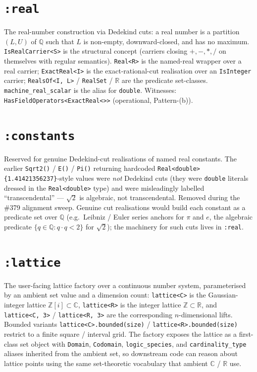 \documentclass[11pt, a4paper]{report}
\begin{document}
\section{\texttt{:real}}
\label{sec:numbers-real}

The real-number construction via Dedekind cuts: a real number is a partition $(L, U)$ of $\mathbb{Q}$ such that $L$ is non-empty, downward-closed, and has no maximum. \texttt{IsRealCarrier<S>} is the structural concept (carriers closing $+, -, *, /$ on themselves with regular semantics). \texttt{Real<R>} is the named-real wrapper over a real carrier; \texttt{ExactReal<I>} is the exact-rational-cut realisation over an \texttt{IsInteger} carrier; \texttt{RealsOf<I, L>} / \texttt{RealSet} / $\mathbb{R}$ are the predicate set-classes. \texttt{machine\_real\_scalar} is the alias for \texttt{double}. Witnesses: \texttt{HasFieldOperators<ExactReal<>>} (operational, Pattern-(b)).

\section{\texttt{:constants}}
\label{sec:numbers-constants}

Reserved for genuine Dedekind-cut realisations of named real constants. The earlier \texttt{Sqrt2()} / \texttt{E()} / \texttt{Pi()} returning hardcoded \texttt{Real<double>\{1.41421356237\}}-style values were \emph{not} Dedekind cuts (they were \texttt{double} literals dressed in the \texttt{Real<double>} type) and were misleadingly labelled ``transcendental'' --- $\sqrt{2}$ is algebraic, not transcendental. Removed during the \#379 alignment sweep. Genuine cut realisations would build each constant as a predicate set over $\mathbb{Q}$ (e.g.\ Leibniz / Euler series anchors for $\pi$ and $e$, the algebraic predicate $\{q \in \mathbb{Q} : q \cdot q < 2\}$ for $\sqrt{2}$); the machinery for such cuts lives in \texttt{:real}.

\section{\texttt{:lattice}}
\label{sec:numbers-lattice}

The user-facing lattice factory over a continuous number system, parameterised by an ambient set value and a dimension count: \texttt{lattice<C>} is the Gaussian-integer lattice $\mathbb{Z}[i] \subset \mathbb{C}$, \texttt{lattice<R>} is the integer lattice $\mathbb{Z} \subset \mathbb{R}$, and \texttt{lattice<C, 3>} / \texttt{lattice<R, 3>} are the corresponding $n$-dimensional lifts. Bounded variants \texttt{lattice<C>.bounded(size)} / \texttt{lattice<R>.bounded(size)} restrict to a finite square / interval grid. The factory exposes the lattice as a first-class set object with \texttt{Domain}, \texttt{Codomain}, \texttt{logic\_species}, and \texttt{cardinality\_type} aliases inherited from the ambient set, so downstream code can reason about lattice points using the same set-theoretic vocabulary that ambient $\mathbb{C}$ / $\mathbb{R}$ use.
\end{document}
